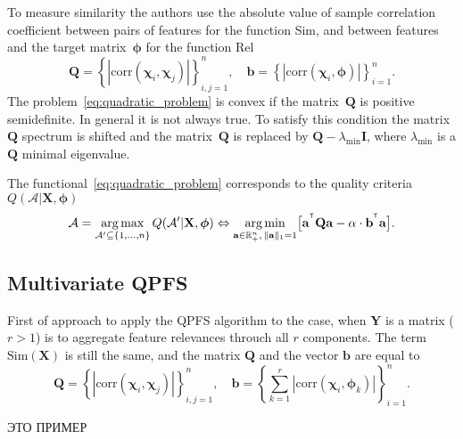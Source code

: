 \documentclass[12pt,twoside]{article}
\newcommand{\ba}{\mathbf{a}}
\newcommand{\bb}{\mathbf{b}}
\newcommand{\bY}{\mathbf{Y}}
\newcommand{\bX}{\mathbf{X}}
\newcommand{\bQ}{\mathbf{Q}}
\newcommand{\bbR}{\mathbb{R}}
\newcommand{\cA}{\mathcal{A}}
\newcommand{\bchi}{\boldsymbol{\chi}}
\newcommand{\bphi}{\boldsymbol{\phi}}
\newcommand{\T}{^{\text{\tiny\sffamily\upshape\mdseries T}}}
\newcommand{\argmin}{\mathop{\arg \min}\limits}
\newcommand{\argmax}{\mathop{\arg \max}\limits}
\begin{document}
To measure similarity the authors use the absolute value of sample correlation coefficient between pairs of features for the function Sim, and between features and the target matrix~$\bphi$ for the function Rel
\begin{equation}
	\bQ = \left\{\left|\text{corr}(\bchi_i, \bchi_j)\right|\right\}_{i,j=1}^n, \quad \bb = \left\{\left|\text{corr}(\bchi_i, \bphi)\right|\right\}_{i=1}^n.
	\label{eq:qpfs_1d_qb}
\end{equation}
The problem~\eqref{eq:quadratic_problem} is convex if the matrix~$\bQ$ is positive semidefinite. In general it is not always true. 
To satisfy this condition the matrix~$\bQ$ spectrum is shifted and the matrix~$\bQ$ is replaced by $\bQ - \lambda_{\text{min}} \mathbf{I}$, where $\lambda_{\text{min}} $ is a $\bQ$ minimal eigenvalue.

The functional~\eqref{eq:quadratic_problem} corresponds to the quality criteria~$Q(\cA | \bX, \bphi)$
\begin{equation}
\cA = \argmax_{\cA' \subseteq \{1, \dots, n\}} Q(\cA' | \bX, \bphi) \Leftrightarrow \argmin_{\ba  \in \bbR^n_+, \, \|\ba\|_1=1} \bigl[\ba^{\T} \bQ \ba - \alpha \cdot \mathbf{b}^{\T} \ba \bigr].
\end{equation}

\subsection{Multivariate QPFS}
First of approach to apply the QPFS algorithm to the case, when $\bY$ is a matrix ($r > 1$) is to aggregate feature relevances throuch all $r$ components. The term $\text{Sim}(\bX)$ is still the same, and the matrix $\bQ$ and the vector $\bb$ are equal to
\begin{equation*}
\bQ = \left\{\left|\text{corr}(\bchi_i, \bchi_j)\right|\right\}_{i,j=1}^n, \quad \bb = \left\{\sum_{k=1}^r\left|\text{corr}(\bchi_i, \bphi_k)\right|\right\}_{i=1}^n.
\end{equation*}

ЭТО ПРИМЕР
\end{document}
